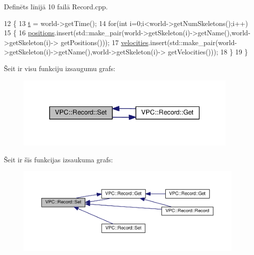Definēts līnijā 10 failā Record.\+cpp.


\begin{DoxyCode}
12 \{
13     \hyperlink{class_v_p_c_1_1_record_af9b5867d85eb7d0073ced8bd09a79626}{t} = world->getTime();
14     \textcolor{keywordflow}{for}(\textcolor{keywordtype}{int} i=0;i<world->getNumSkeletons();i++)
15     \{
16         \hyperlink{class_v_p_c_1_1_record_aeea0f4576199ce09ffc7870c792624d0}{positions}.insert(std::make\_pair(world->getSkeleton(i)->getName(),world->getSkeleton(i)->
      getPositions()));
17         \hyperlink{class_v_p_c_1_1_record_a6d0ac69f7cb390fd819cb006f23d6e32}{velocities}.insert(std::make\_pair(world->getSkeleton(i)->getName(),world->getSkeleton(i)->
      getVelocities()));
18     \}
19 \}
\end{DoxyCode}


Šeit ir visu funkciju izsaugumu grafs\+:
\nopagebreak
\begin{figure}[H]
\begin{center}
\leavevmode
\includegraphics[width=309pt]{class_v_p_c_1_1_record_a9a4211edc9dd0352403d3e501366ba53_cgraph}
\end{center}
\end{figure}




Šeit ir šīs funkcijas izsaukuma grafs\+:
\nopagebreak
\begin{figure}[H]
\begin{center}
\leavevmode
\includegraphics[width=350pt]{class_v_p_c_1_1_record_a9a4211edc9dd0352403d3e501366ba53_icgraph}
\end{center}
\end{figure}


